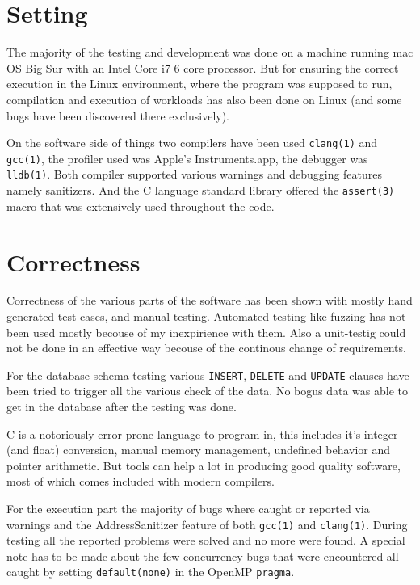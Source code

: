 \documentclass[Lau]{sapthesis} %
\let\oldsection\section
\def\subsection{\oldsection}
\def\section{\chapter}
\begin{document}
\subsection{Setting}

The majority of the testing and development was done on a machine running mac OS
Big Sur with an Intel Core i7 6 core processor. But for ensuring the correct
execution in the Linux environment, where the program was supposed to run,
compilation and execution of workloads has also been done on Linux (and some
bugs have been discovered there exclusively).

On the software side of things two compilers have been used \texttt{clang(1)}
and \texttt{gcc(1)}, the profiler used was Apple's Instruments.app, the debugger
was \texttt{lldb(1)}. Both compiler supported various warnings and debugging
features namely sanitizers. And the C language standard library offered the
\texttt{assert(3)} macro that was extensively used throughout the code.

\subsection{Correctness}

Correctness of the various parts of the software has been shown with mostly hand
generated test cases, and manual testing. Automated testing like fuzzing has not
been used mostly becouse of my inexpirience with them. Also a unit-testig could
not be done in an effective way becouse of the continous change of requirements.

For the database schema testing various \texttt{INSERT}, \texttt{DELETE} and
\texttt{UPDATE} clauses have been tried to trigger all the various check of the
data. No bogus data was able to get in the database after the testing was done.

C is a notoriously error prone language to program in, this includes it's
integer (and float) conversion, manual memory management, undefined behavior and
pointer arithmetic. But tools can help a lot in producing good quality software,
most of which comes included with modern compilers.

For the execution part the majority of bugs where caught or reported via
warnings and the AddressSanitizer \cite{asan} feature of both \texttt{gcc(1)}
and \texttt{clang(1)}. During testing all the reported problems were solved and
no more were found. A special note has to be made about the few concurrency bugs
that were encountered all caught by setting \texttt{default(none)} in the OpenMP
\texttt{pragma}.
\end{document}

